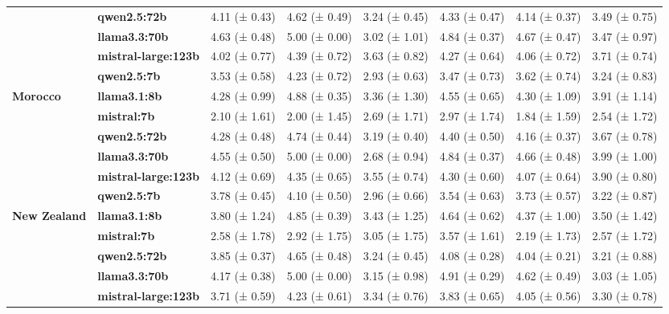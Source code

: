 \begin{longtable}{llllllll}
\textbf{} & \textbf{qwen2.5:72b} & 4.11 (± 0.43) & 4.62 (± 0.49) & 3.24 (± 0.45) & 4.33 (± 0.47) & 4.14 (± 0.37) & 3.49 (± 0.75) \\
\textbf{} & \textbf{llama3.3:70b} & 4.63 (± 0.48) & 5.00 (± 0.00) & 3.02 (± 1.01) & 4.84 (± 0.37) & 4.67 (± 0.47) & 3.47 (± 0.97) \\
\textbf{} & \textbf{mistral-large:123b} & 4.02 (± 0.77) & 4.39 (± 0.72) & 3.63 (± 0.82) & 4.27 (± 0.64) & 4.06 (± 0.72) & 3.71 (± 0.74) \\
\textbf{} & \textbf{qwen2.5:7b} & 3.53 (± 0.58) & 4.23 (± 0.72) & 2.93 (± 0.63) & 3.47 (± 0.73) & 3.62 (± 0.74) & 3.24 (± 0.83) \\
\cline{1-8}
\multirow[t]{6}{*}{\textbf{Morocco}} & \textbf{llama3.1:8b} & 4.28 (± 0.99) & 4.88 (± 0.35) & 3.36 (± 1.30) & 4.55 (± 0.65) & 4.30 (± 1.09) & 3.91 (± 1.14) \\
\textbf{} & \textbf{mistral:7b} & 2.10 (± 1.61) & 2.00 (± 1.45) & 2.69 (± 1.71) & 2.97 (± 1.74) & 1.84 (± 1.59) & 2.54 (± 1.72) \\
\textbf{} & \textbf{qwen2.5:72b} & 4.28 (± 0.48) & 4.74 (± 0.44) & 3.19 (± 0.40) & 4.40 (± 0.50) & 4.16 (± 0.37) & 3.67 (± 0.78) \\
\textbf{} & \textbf{llama3.3:70b} & 4.55 (± 0.50) & 5.00 (± 0.00) & 2.68 (± 0.94) & 4.84 (± 0.37) & 4.66 (± 0.48) & 3.99 (± 1.00) \\
\textbf{} & \textbf{mistral-large:123b} & 4.12 (± 0.69) & 4.35 (± 0.65) & 3.55 (± 0.74) & 4.30 (± 0.60) & 4.07 (± 0.64) & 3.90 (± 0.80) \\
\textbf{} & \textbf{qwen2.5:7b} & 3.78 (± 0.45) & 4.10 (± 0.50) & 2.96 (± 0.66) & 3.54 (± 0.63) & 3.73 (± 0.57) & 3.22 (± 0.87) \\
\cline{1-8}
\multirow[t]{6}{*}{\textbf{New Zealand}} & \textbf{llama3.1:8b} & 3.80 (± 1.24) & 4.85 (± 0.39) & 3.43 (± 1.25) & 4.64 (± 0.62) & 4.37 (± 1.00) & 3.50 (± 1.42) \\
\textbf{} & \textbf{mistral:7b} & 2.58 (± 1.78) & 2.92 (± 1.75) & 3.05 (± 1.75) & 3.57 (± 1.61) & 2.19 (± 1.73) & 2.57 (± 1.72) \\
\textbf{} & \textbf{qwen2.5:72b} & 3.85 (± 0.37) & 4.65 (± 0.48) & 3.24 (± 0.45) & 4.08 (± 0.28) & 4.04 (± 0.21) & 3.21 (± 0.88) \\
\textbf{} & \textbf{llama3.3:70b} & 4.17 (± 0.38) & 5.00 (± 0.00) & 3.15 (± 0.98) & 4.91 (± 0.29) & 4.62 (± 0.49) & 3.03 (± 1.05) \\
\textbf{} & \textbf{mistral-large:123b} & 3.71 (± 0.59) & 4.23 (± 0.61) & 3.34 (± 0.76) & 3.83 (± 0.65) & 4.05 (± 0.56) & 3.30 (± 0.78) \\

\end{longtable}
